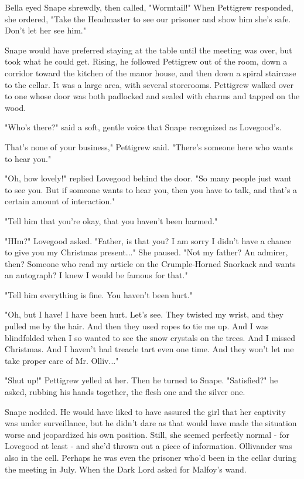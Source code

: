 Bella eyed Snape shrewdly, then called, "Wormtail!" When Pettigrew responded, she ordered, "Take the Headmaster to see our prisoner and show him she's safe. Don't let her see him."

Snape would have preferred staying at the table until the meeting was over, but took what he could get. Rising, he followed Pettigrew out of the room, down a corridor toward the kitchen of the manor house, and then down a spiral staircase to the cellar. It was a large area, with several storerooms. Pettigrew walked over to one whose door was both padlocked and sealed with charms and tapped on the wood.

"Who's there?" said a soft, gentle voice that Snape recognized as Lovegood's.

That's none of your business," Pettigrew said. "There's someone here who wants to hear you."

"Oh, how lovely!" replied Lovegood behind the door. "So many people just want to see you. But if someone wants to hear you, then you have to talk, and that's a certain amount of interaction."

"Tell him that you're okay, that you haven't been harmed."

"HIm?" Lovegood asked. "Father, is that you? I am sorry I didn't have a chance to give you my Christmas present..." She paused. "Not my father? An admirer, then? Someone who read my article on the Crumple-Horned Snorkack and wants an autograph? I knew I would be famous for that."

"Tell him everything is fine. You haven't been hurt."

"Oh, but I have! I have been hurt. Let's see. They twisted my wrist, and they pulled me by the hair. And then they used ropes to tie me up. And I was blindfolded when I so wanted to see the snow crystals on the trees. And I missed Christmas. And I haven't had treacle tart even one time. And they won't let me take proper care of Mr. Olliv..."

"Shut up!" Pettigrew yelled at her. Then he turned to Snape. "Satisfied?" he asked, rubbing his hands together, the flesh one and the silver one.

Snape nodded. He would have liked to have assured the girl that her captivity was under surveillance, but he didn't dare as that would have made the situation worse and jeopardized his own position. Still, she seemed perfectly normal - for Lovegood at least - and she'd thrown out a piece of information. Ollivander was also in the cell. Perhaps he was even the prisoner who'd been in the cellar during the meeting in July. When the Dark Lord asked for Malfoy's wand.

